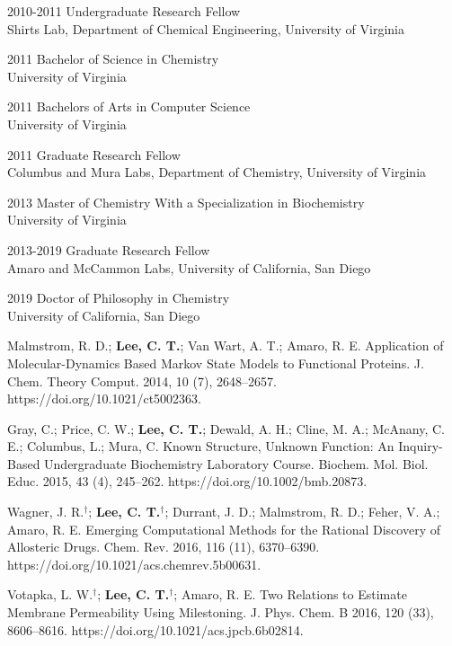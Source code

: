 \begin{frontmatter}
%
%
\begin{vitapage}
\begin{vita}
  \item[2010-2011] Undergraduate Research Fellow\\ Shirts Lab, Department of Chemical Engineering, University of Virginia
  \item[2011] Bachelor of Science in Chemistry\\University of Virginia
  \item[2011] Bachelors of Arts in Computer Science\\
  University of Virginia
  \item[2011] Graduate Research Fellow\\
  Columbus and Mura Labs, Department of Chemistry, University of Virginia
  \item[2013] Master of Chemistry With a Specialization in Biochemistry\\ University of Virginia
  \item[2013-2019] Graduate Research Fellow\\ Amaro and McCammon Labs, University of California, San Diego
  \item[2019] Doctor of Philosophy in Chemistry\\ University of California, San Diego
\end{vita}
\begin{publications}
  \item Malmstrom, R. D.; \textbf{Lee, C. T.}; Van Wart, A. T.; Amaro, R. E. Application of Molecular-Dynamics Based Markov State Models to Functional Proteins. J. Chem. Theory Comput. 2014, 10 (7), 2648–2657. https://doi.org/10.1021/ct5002363.
  \item Gray, C.; Price, C. W.; \textbf{Lee, C. T.}; Dewald, A. H.; Cline, M. A.; McAnany, C. E.; Columbus, L.; Mura, C. Known Structure, Unknown Function: An Inquiry-Based Undergraduate Biochemistry Laboratory Course. Biochem. Mol. Biol. Educ. 2015, 43 (4), 245–262. https://doi.org/10.1002/bmb.20873.
  \item Wagner, J. R.$^{\dagger}$; \textbf{Lee, C. T.$^{\dagger}$}; Durrant, J. D.; Malmstrom, R. D.; Feher, V. A.; Amaro, R. E. Emerging Computational Methods for the Rational Discovery of Allosteric Drugs. Chem. Rev. 2016, 116 (11), 6370–6390. https://doi.org/10.1021/acs.chemrev.5b00631.
  \item Votapka, L. W.$^{\dagger}$; \textbf{Lee, C. T.$^{\dagger}$}; Amaro, R. E. Two Relations to Estimate Membrane Permeability Using Milestoning. J. Phys. Chem. B 2016, 120 (33), 8606–8616. https://doi.org/10.1021/acs.jpcb.6b02814.

\end{publications}
\end{vitapage}
\end{frontmatter}
